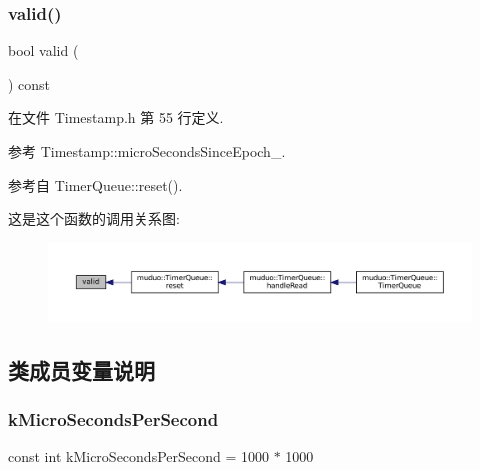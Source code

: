 \subsubsection{\texorpdfstring{valid()}{valid()}}
{\footnotesize\ttfamily bool valid (\begin{DoxyParamCaption}{ }\end{DoxyParamCaption}) const\hspace{0.3cm}{\ttfamily [inline]}}



在文件 Timestamp.\+h 第 55 行定义.



参考 Timestamp\+::micro\+Seconds\+Since\+Epoch\+\_\+.



参考自 Timer\+Queue\+::reset().

这是这个函数的调用关系图\+:
\nopagebreak
\begin{figure}[H]
\begin{center}
\leavevmode
\includegraphics[width=350pt]{classmuduo_1_1Timestamp_a315419f26d3c59fa143b49b90a019049_icgraph}
\end{center}
\end{figure}


\subsection{类成员变量说明}
\mbox{\label{classmuduo_1_1Timestamp_a2659197720e28bf9db3631a73f16f7ff}} 
\subsubsection{\texorpdfstring{k\+Micro\+Seconds\+Per\+Second}{kMicroSecondsPerSecond}}
{\footnotesize\ttfamily const int k\+Micro\+Seconds\+Per\+Second = 1000 $\ast$ 1000\hspace{0.3cm}{\ttfamily [static]}}



